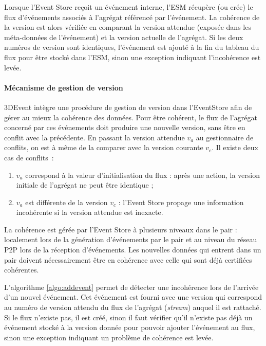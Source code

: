 Lorsque l'Event Store reçoit un événement interne, l'\gls{ESM} récupère (ou crée) 
le flux d'événements associés à l'agrégat référencé par l'événement. 
La cohérence de la version est alors vérifiée en comparant la version attendue 
(exposée dans les méta-données de l'événement) et la version actuelle de 
l'agrégat. 
Si les deux numéros de version sont identiques, l'événement est ajouté à la fin du 
tableau du flux pour être stocké dans l'\gls{ESM}, sinon une exception indiquant 
l'incohérence est levée. 


\paragraph{Mécanisme de gestion de version}
3DEvent intègre une procédure de gestion de version dans l'\gls{EventStore} afin 
de gérer au mieux la cohérence des données. 
Pour être cohérent, le flux de l'agrégat concerné par ces 
événements doit produire une nouvelle version, sans être en conflit avec la 
précédente. En passant la version attendue $v_a$ au gestionnaire de conflits, on 
est à même de la comparer avec la version courante $v_c$. Il existe deux cas de 
conflits~: 
\begin{enumerate}[label=\alph*)]
	\item \label{i:vi} $v_a$ correspond à la valeur d'initialisation du flux : après une 
	action, la version initiale de l'agrégat ne peut être identique ;
	\item \label{i:vdiff} $v_a$ est différente de la version $v_c$ : l'Event Store 
	propage une information incohérente si la version attendue est inexacte.
\end{enumerate}

La cohérence est gérée par l'Event Store à plusieurs niveaux dans le pair :  
localement lors de la génération d'événements par le pair et au niveau du réseau 
\gls{P2P} lors de la réception d'événements.
Les nouvelles données qui entrent dans un pair doivent nécessairement être en 
cohérence avec celle qui sont déjà certifiées cohérentes.

L'algorithme \ref{algo:addevent} permet de détecter une incohérence lors de 
l'arrivée d'un nouvel événement. Cet événement est fourni avec une version qui 
correspond au numéro de version attendu du flux de l'agrégat 
(\textit{stream}) auquel il est rattaché. Si le flux n'existe pas, il est créé, sinon il 
faut vérifier qu'il n'existe pas déjà un événement stocké à la version donnée pour 
pouvoir ajouter l'événement au flux, sinon une exception indiquant un problème de 
cohérence est levée.

